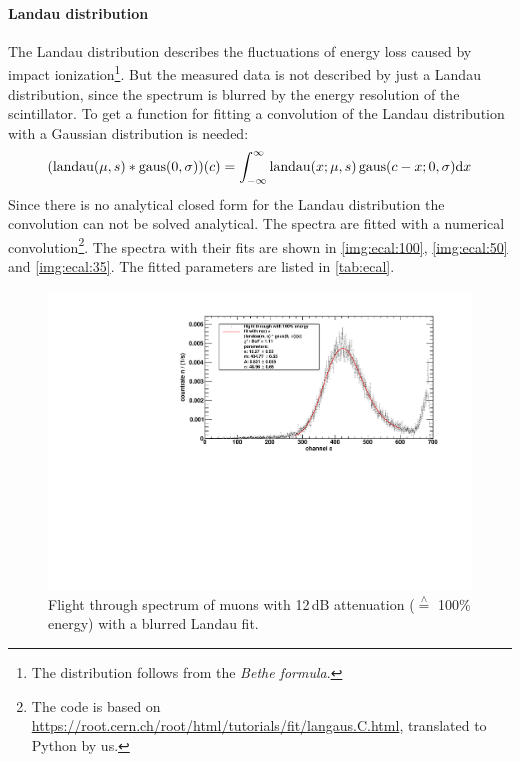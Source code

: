 \paragraph{Landau distribution}
The Landau distribution describes the fluctuations of energy loss caused by impact 
ionization\footnote{The distribution follows from the \emph{Bethe formula}.}.
But the measured data is not described by just a Landau distribution, since the spectrum is blurred by the energy resolution of the scintillator. 
To get a function for fitting a convolution of the Landau distribution with a Gaussian distribution is needed:
\begin{equation}
    \label{eq:landaugausconv}
    (\operatorname{landau}(\mu, s) *  \operatorname{gaus}(0, \sigma))(c) = \int_{-\infty}^{\infty} \operatorname{landau}(x;\mu, s) \operatorname{gaus}(c-x;0,\sigma)\mathrm{d} x
\end{equation}
Since there is no analytical closed form for the Landau distribution the convolution can not be solved analytical. The spectra are fitted with a
numerical convolution\footnote{The code is based on \url{https://root.cern.ch/root/html/tutorials/fit/langaus.C.html}, translated to Python by us.}. 
The spectra with their fits are shown in \autoref{img:ecal:100}, \autoref{img:ecal:50} and \autoref{img:ecal:35}. The fitted parameters are listed in 
\autoref{tab:ecal}.
\begin{figure}[H]
\begin{center}
  \includegraphics[width=\textwidth]{../img/energiekalibration_100.pdf}
  \caption{Flight through spectrum of muons with 12\,dB attenuation ($\overset{\wedge}{=}$ 100\% energy) with a blurred Landau fit.}
  \label{img:ecal:100}
\end{center}
\end{figure}


